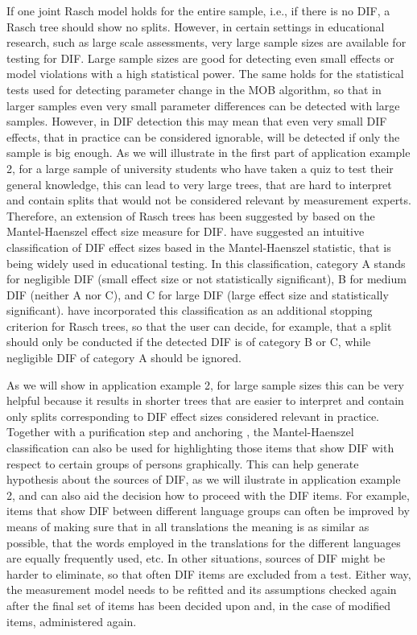 \documentclass[doc,floatsintext,natbib]{apa7}
\begin{document}
If one joint Rasch model holds for the entire sample, i.e., if there is no DIF, a Rasch tree should show no splits. However, in certain settings in educational research, such as large scale assessments, very large sample sizes are available for testing for DIF. Large sample sizes are good for detecting even small effects or model violations with a high statistical power. The same holds for the statistical tests used for detecting parameter change in the MOB algorithm, so that in larger samples even very small parameter differences can be detected with large samples. However, in DIF detection this may mean that even very small DIF effects, that in practice can be considered ignorable, will be detected if only the sample is big enough. As we will illustrate in the first part of application example 2, for a large sample of university students who have taken a quiz to test their general knowledge, this can lead to very large trees, that are hard to interpret and contain splits that would not be considered relevant by measurement experts. Therefore, an extension of Rasch trees has been suggested by \citet{HenDebStr:2023:EPM} based on the Mantel-Haenszel effect size measure for DIF. \citet{HolTha:1985} have suggested an intuitive classification of DIF effect sizes based in the Mantel-Haenszel statistic, that is being widely used in educational testing. In this classification, category A stands for negligible DIF (small effect size or not statistically significant), B for medium DIF (neither A nor C), and C for large DIF (large effect size and statistically significant). \citet{HenDebStr:2023:EPM} have incorporated this classification as an additional stopping criterion for Rasch trees, so that the user can decide, for example, that a split should only be conducted if the detected DIF is of category B or C, while negligible DIF of category A should be ignored. 

As we will show in application example 2, for large sample sizes this can be very helpful because it results in shorter trees that are easier to interpret and contain only splits corresponding to DIF effect sizes considered relevant in practice. Together with a purification step and anchoring \citep[see][and application example 2 for details]{HenDebStr:2023:EPM}, the Mantel-Haenszel classification can also be used for highlighting those items that show DIF with respect to certain groups of persons graphically. This can help generate hypothesis about the sources of DIF, as we will ilustrate in application example 2, and can also aid the decision how to proceed with the DIF items. 
For example, items that show DIF between different language groups can often be improved by means of making sure that in all translations the meaning is as similar as possible, that the words employed in the translations for the different languages are equally frequently used, etc. In other situations, sources of DIF might be harder to eliminate, so that often DIF items are excluded from a test. Either way, the measurement model needs to be refitted and its assumptions checked again after the final set of items has been decided upon and, in the case of modified items, administered again. 
\end{document}

